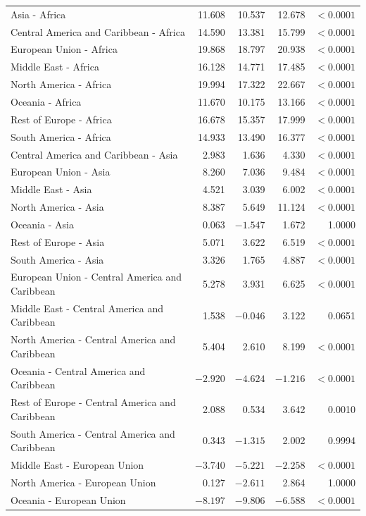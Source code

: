 \documentclass[3pt, a4paper]{article}
\begin{document}
\begin{small}
\begin{longtable}{>{\raggedright\arraybackslash}p{5.2cm}rrrr}
Asia - Africa & 11.608 & 10.537 & 12.678 & $< 0.0001$ \\
Central America and Caribbean - Africa & 14.590 & 13.381 & 15.799 & $< 0.0001$ \\
European Union - Africa & 19.868 & 18.797 & 20.938 & $< 0.0001$ \\
Middle East - Africa & 16.128 & 14.771 & 17.485 & $< 0.0001$ \\
North America - Africa & 19.994 & 17.322 & 22.667 & $< 0.0001$ \\
Oceania - Africa & 11.670 & 10.175 & 13.166 & $< 0.0001$ \\
Rest of Europe - Africa & 16.678 & 15.357 & 17.999 & $< 0.0001$ \\
South America - Africa & 14.933 & 13.490 & 16.377 & $< 0.0001$ \\
\midrule
Central America and Caribbean - Asia & 2.983 & 1.636 & 4.330 & $< 0.0001$ \\
European Union - Asia & 8.260 & 7.036 & 9.484 & $< 0.0001$ \\
Middle East - Asia & 4.521 & 3.039 & 6.002 & $< 0.0001$ \\
North America - Asia & 8.387 & 5.649 & 11.124 & $< 0.0001$ \\
Oceania - Asia & 0.063 & $-1.547$ & 1.672 & 1.0000 \\
Rest of Europe - Asia & 5.071 & 3.622 & 6.519 & $< 0.0001$ \\
South America - Asia & 3.326 & 1.765 & 4.887 & $< 0.0001$ \\
\midrule
European Union - Central America and Caribbean & 5.278 & 3.931 & 6.625 & $< 0.0001$ \\
Middle East - Central America and Caribbean & 1.538 & $-0.046$ & 3.122 & 0.0651 \\
North America - Central America and Caribbean & 5.404 & 2.610 & 8.199 & $< 0.0001$ \\
Oceania - Central America and Caribbean & $-2.920$ & $-4.624$ & $-1.216$ & $< 0.0001$ \\
Rest of Europe - Central America and Caribbean & 2.088 & 0.534 & 3.642 & 0.0010 \\
South America - Central America and Caribbean & 0.343 & $-1.315$ & 2.002 & 0.9994 \\
\midrule
Middle East - European Union & $-3.740$ & $-5.221$ & $-2.258$ & $< 0.0001$ \\
North America - European Union & 0.127 & $-2.611$ & 2.864 & 1.0000 \\
Oceania - European Union & $-8.197$ & $-9.806$ & $-6.588$ & $< 0.0001$ \\

\end{longtable}
\end{small}
\end{document}
